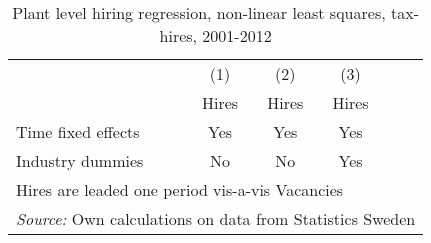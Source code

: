 \begin{table}[htbp]\centering
\def\sym#1{\ifmmode^{#1}\else\(^{#1}\)\fi}
\caption{Plant level hiring regression, non-linear least squares, tax-hires, 2001-2012}
\begin{tabular}{l*{5}{c}}
\hline\hline
                &\multicolumn{1}{c}{(1)}&\multicolumn{1}{c}{(2)}&\multicolumn{1}{c}{(3)}\\
                &\multicolumn{1}{c}{Hires}&\multicolumn{1}{c}{Hires}&\multicolumn{1}{c}{Hires}\\
\hline


\hline 
Time fixed effects  &         Yes         &         Yes         &         Yes                      \\
[1em]
Industry dummies    &          No         &          No         &         Yes               \\
[1em]
\hline 


\hline\hline
\multicolumn{6}{l}{\footnotesize Hires are leaded one period vis-a-vis Vacancies}\\
\multicolumn{6}{l}{\footnotesize \emph{Source:} Own calculations on data from Statistics Sweden}\\
\end{tabular}
\end{table}
